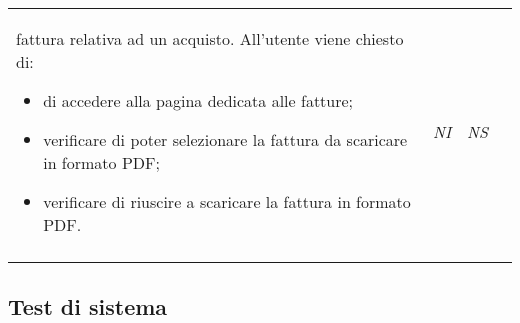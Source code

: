 \begin{longtable}{ >{\centering}p{} >{}p{}
			>{\centering}p{} >{\centering}p{}}
		 fattura relativa ad un acquisto. All'utente viene chiesto di:
		 \begin{itemize}
		 	\item di accedere alla pagina dedicata alle fatture;
		 	\item verificare di poter selezionare la fattura da scaricare in formato PDF;
		 	\item verificare di riuscire a scaricare la fattura in formato PDF.
		 \end{itemize} & \textit{NI} & \textit{NS}\\ \tabularnewline
\end{longtable}

\subsection{Test di sistema}
	\renewcommand{\arraystretch}{1.5}
	
